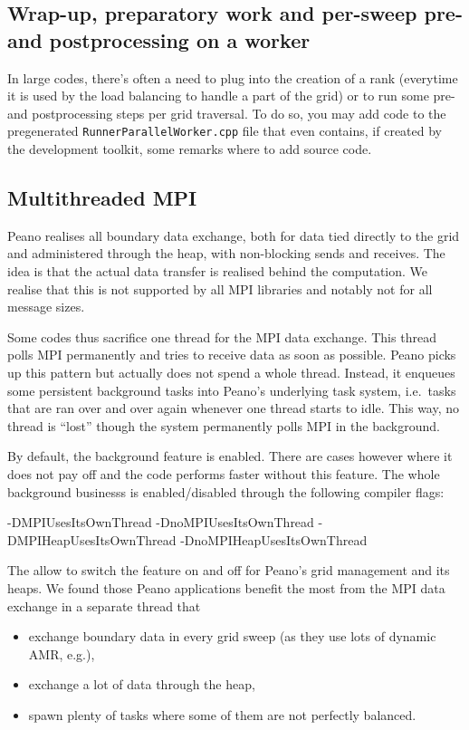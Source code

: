 \subsection{Wrap-up, preparatory work and per-sweep pre- and postprocessing
on a worker}

In large codes, there's often a need to plug into the creation of a rank
(everytime it is used by the load balancing to handle a part of the grid) or to
run some pre- and postprocessing steps per grid traversal. 
To do so, you may add code to the pregenerated \texttt{RunnerParallelWorker.cpp}
file that even contains, if created by the development toolkit, some remarks
where to add source code.


\subsection{Multithreaded MPI}

Peano realises all boundary data exchange, both for data tied directly to the
grid and administered through the heap, with non-blocking sends and receives.
The idea is that the actual data transfer is realised behind the computation. 
We realise that this is not supported by all MPI libraries and notably not for
all message sizes.


Some codes thus sacrifice
one thread for the MPI data exchange. This thread polls MPI permanently
and tries to receive data as soon as possible. Peano picks up this pattern but
actually does not spend a whole thread. 
Instead, it enqueues some persistent background tasks into Peano's underlying
task system, i.e.~tasks that are ran over and over again whenever one thread
starts to idle.
This way, no thread is ``lost'' though the system permanently polls MPI in the
background.


By default, the background feature is enabled. There are cases however where it
does not pay off and the code performs faster without this feature. The whole
background businesss is enabled/disabled through the following compiler flags:

\begin{code}
 -DMPIUsesItsOwnThread
 -DnoMPIUsesItsOwnThread
 -DMPIHeapUsesItsOwnThread
 -DnoMPIHeapUsesItsOwnThread
\end{code}

\noindent
The allow to switch the feature on and off for Peano's grid management and its
heaps.
We found those Peano applications benefit the most from the MPI data exchange
in a separate thread that
\begin{itemize}
  \item exchange boundary data in every grid sweep (as they use lots of dynamic AMR, e.g.),
  \item exchange a lot of data through the heap,
  \item spawn plenty of tasks where some of them are not perfectly balanced.
\end{itemize}


